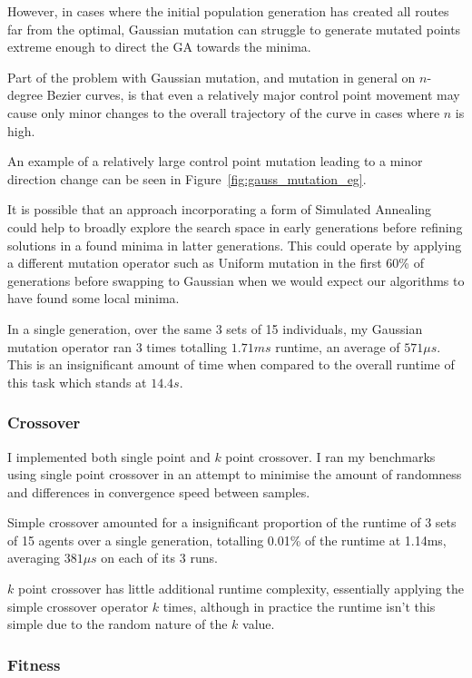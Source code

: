 However, in cases where the initial population generation has created all routes far from the optimal, Gaussian mutation can struggle to generate mutated points extreme enough to direct the GA towards the minima.

Part of the problem with Gaussian mutation, and mutation in general on $n$-degree Bezier curves, is that even a relatively major control point movement may cause only minor changes to the overall trajectory of the curve in cases where $n$ is high.

An example of a relatively large control point mutation leading to a minor direction change can be seen in Figure~\ref{fig:gauss_mutation_eg}.

It is possible that an approach incorporating a form of Simulated Annealing could help to broadly explore the search space in early generations before refining solutions in a found minima in latter generations. This could operate by applying a different mutation operator such as Uniform mutation in the first 60\% of generations before swapping to Gaussian when we would expect our algorithms to have found some local minima.

In a single generation, over the same 3 sets of 15 individuals, my Gaussian mutation operator ran 3 times totalling $1.71 ms$ runtime, an average of $571\mu s$. This is an insignificant amount of time when compared to the overall runtime of this task which stands at $14.4s$.

\subsubsection{Crossover}

I implemented both single point and $k$ point crossover. I ran my benchmarks using single point crossover in an attempt to minimise the amount of randomness and differences in convergence speed between samples.

Simple crossover amounted for a insignificant proportion of the runtime of 3 sets of 15 agents over a single generation, totalling 0.01\% of the runtime at 1.14ms, averaging $381\mu s$ on each of its 3 runs.

$k$ point crossover has little additional runtime complexity, essentially applying the simple crossover operator $k$ times, although in practice the runtime isn't this simple due to the random nature of the $k$ value.


\subsubsection{Fitness}

